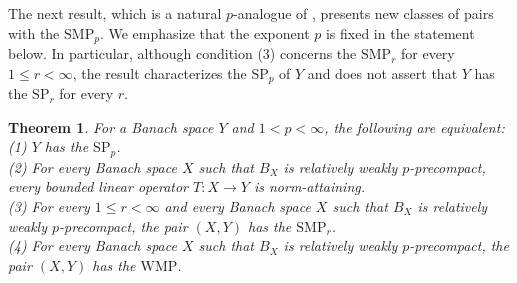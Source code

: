 \documentclass[12 pt]{article}%
\newtheorem{theorem}{Theorem}[section]
\newtheorem{final remark}[theorem]{Final Remark}
\begin{document}
The next result, which is a natural $p$-analogue of \cite[Theorem 3.5]{dantasjung}, presents new classes of pairs with the $\mathrm{SMP}_p$. We emphasize that the exponent $p$ is fixed in the statement below. In particular, although condition (3) concerns the $\mathrm{SMP}_r$ for every $1 \leq r < \infty$, the result characterizes the $\mathrm{SP}_p$ of $Y$ and does not assert that $Y$ has the $\mathrm{SP}_r$ for every $r$.

\begin{theorem}\label{p-schuriff}
For a Banach space $Y$ and $1 < p < \infty$, the following are equivalent: \\
{\rm (1)} $Y$ has the $\mathrm{SP}_p$. \\
{\rm (2)} For every Banach space $X$ such that $B_X$ is relatively weakly $p$-precompact, every bounded linear operator $T: X \to Y$ is norm-attaining. \\
{\rm (3)} For every $1 \leq r < \infty$ and every Banach space $X$ such that $B_X$ is relatively weakly $p$-precompact, the pair $(X, Y)$ has the $\mathrm{SMP}_r$. \\
{\rm (4)} For every Banach space $X$ such that $B_X$ is relatively weakly $p$-precompact, the pair $(X, Y)$ has the $\mathrm{WMP}$.
\end{theorem}
\end{document}
